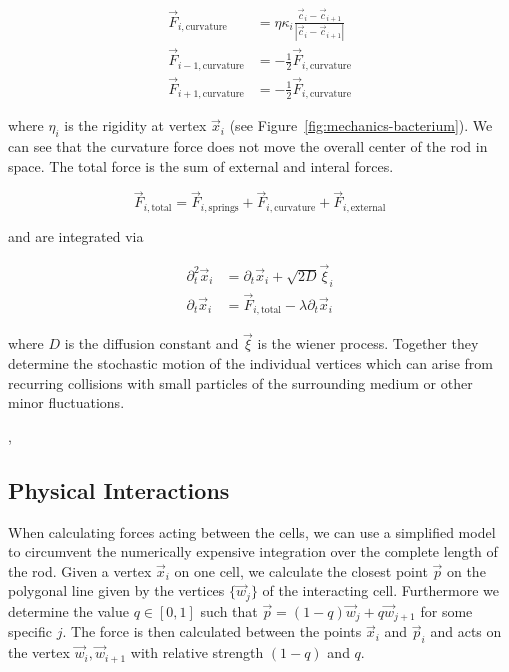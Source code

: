 \documentclass{article}
\begin{document}
\begin{align}
    \vec{F}_{i,\text{curvature}} &= \eta\kappa_i
        \frac{\vec{c}_i - \vec{c}_{i+1}}{|\vec{c}_i-\vec{c}_{i+1}|}\\
    \vec{F}_{i-1,\text{curvature}} &= -\frac{1}{2}\vec{F}_{i,\text{curvature}}\\
    \vec{F}_{i+1,\text{curvature}} &= -\frac{1}{2}\vec{F}_{i,\text{curvature}}
\end{align}

where $\eta_i$ is the rigidity at vertex $\vec{x}_i$ (see Figure~\ref{fig:mechanics-bacterium}).
We can see that the curvature force does not move the overall center of the rod in space.
The total force is the sum of external and interal forces.

\begin{equation}
    \vec{F}_{i,\text{total}} = \vec{F}_{i,\text{springs}}+ \vec{F}_{i,\text{curvature}}
        + \vec{F}_{i,\text{external}}
\end{equation}

and are integrated via

\begin{align}
    \partial_t^2 \vec{x}_i &= \partial_t\vec{x}_i + \sqrt{2D}\vec{\xi}_i\\
    \partial_t\vec{x}_i &= \vec{F}_{i,\text{total}} - \lambda \partial_t\vec{x}_i
\end{align}

where $D$ is the diffusion constant and $\vec{\xi}$ is the wiener process.
Together they determine the stochastic motion of the individual vertices which can arise from
recurring collisions with small particles of the surrounding medium or other minor fluctuations.

\cite{Chatterjee1988},\cite{Ursell2014}

\subsection{Physical Interactions}
\label{subsection:mechanical-model-interactions}

When calculating forces acting between the cells, we can use a simplified model to circumvent the
numerically expensive integration over the complete length of the rod.
Given a vertex $\vec{x}_i$ on one cell, we calculate the closest point $\vec{p}$ on the polygonal
line given by the vertices $\{\vec{w}_j\}$ of the interacting cell.
Furthermore we determine the value $q\in[0,1]$ such that $\vec{p} = (1-q)\vec{w}_j + q\vec{w}_{j+1}$
for some specific $j$.
The force is then calculated between the points $\vec{x}_i$ and $\vec{p}_i$ and acts on
the vertex $\vec{w}_i,\vec{w}_{i+1}$ with relative strength $(1-q)$ and $q$.
\end{document}

